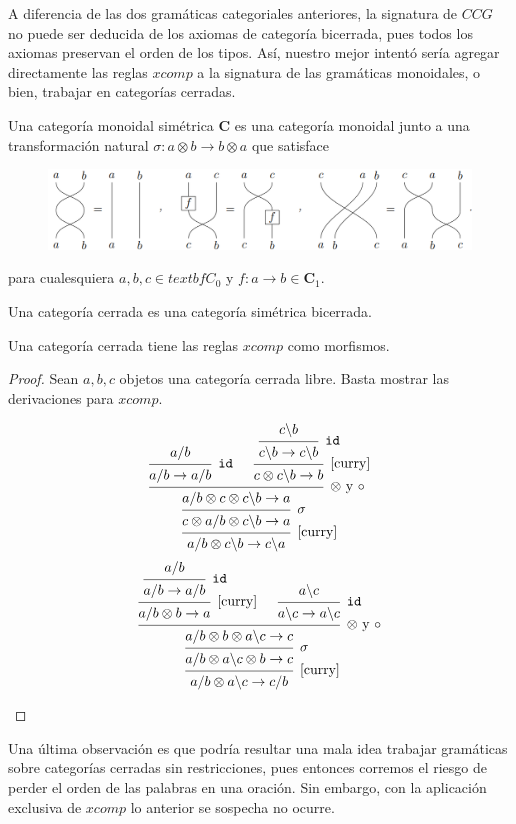 \documentclass[../main.tex]{subfiles}
\begin{document}
	\begin{ej}
	\end{ej}
	
	A diferencia de las dos gramáticas categoriales anteriores, la signatura de $CCG$ no puede ser deducida de los axiomas de categoría bicerrada, pues todos los axiomas preservan el orden de los tipos. Así, nuestro mejor intentó sería agregar directamente las reglas $xcomp$ a la signatura de las gramáticas monoidales, o bien, trabajar en categorías cerradas.
	
	\begin{dfn}
		Una categoría monoidal simétrica \textbf{C} es una categoría monoidal junto a una transformación natural $\sigma:a\otimes b \to b \otimes a$ que satisface  
		\begin{figure}[H]
			\includegraphics[scale=.5]{diagrama/swap.png}
			\centering
		\end{figure}
		para cualesquiera $a,b,c \in textbf{C}_0$ y $f:a \to b \in \textbf{C}_1$.
	\end{dfn} 
	
	\begin{dfn}
		Una categoría cerrada es una categoría simétrica bicerrada.
	\end{dfn}
	
	\begin{prop}
		Una categoría cerrada tiene las reglas $xcomp$ como morfismos.
	\end{prop}
	\begin{proof}
		Sean $a,b,c$ objetos una categoría cerrada libre. Basta mostrar las derivaciones para $xcomp$.
		\begin{multicols}{2}
			\[
		\begin{prooftree}
			\hypo{a/b}
			\infer1[{\tt{id}}]{a/b \to a/b}
			\hypo{c \backslash b}
			\infer1[{\tt{id}}]{c \backslash b \to c \backslash b}
			\infer1[\ref{curry}]{c \otimes c \backslash b \to b}
			\infer2[$\otimes$ y $\circ$]{a/b \otimes c \otimes c \backslash b \to a}
			\infer1[$\sigma$]{c\otimes a/b \otimes c \backslash b \to a}
			\infer1[\ref{curry}]{a/b \otimes c \backslash b \to c \backslash a}
		\end{prooftree}
			\]
			\[
			\begin{prooftree}
				\hypo{a/b}
				\infer1[{\tt{id}}]{a/b \to a/b}
				\infer1[\ref{curry}]{a/b \otimes b \to a}
				\hypo{a \backslash c}
				\infer1[{\tt{id}}]{a \backslash c \to a \backslash c}
				\infer2[$\otimes$ y $\circ$]{a/b \otimes b \otimes a \backslash c \to c}
				\infer1[$\sigma$]{a/b \otimes a \backslash c \otimes b \to c}
				\infer1[\ref{curry}]{a/b \otimes a \backslash c \to c/b}
			\end{prooftree}
			\]
		\end{multicols}
		
	\end{proof}
	
	Una última observación es que podría resultar una mala idea trabajar gramáticas sobre categorías cerradas sin restricciones, pues entonces corremos el riesgo de perder el orden de las palabras en una oración. Sin embargo, con la aplicación exclusiva de $xcomp$ lo anterior se sospecha no ocurre. 
	
\end{document}
